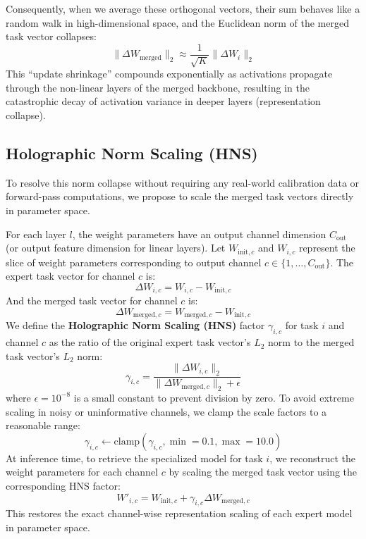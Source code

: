 \documentclass{article}
\theoremstyle{plain}
\theoremstyle{definition}
\theoremstyle{remark}
\begin{document}
Consequently, when we average these orthogonal vectors, their sum behaves like a random walk in high-dimensional space, and the Euclidean norm of the merged task vector collapses:
\begin{equation}
  \|\Delta W_{\text{merged}}\|_2 \approx \frac{1}{\sqrt{K}} \|\Delta W_i\|_2
\end{equation}
This ``update shrinkage'' compounds exponentially as activations propagate through the non-linear layers of the merged backbone, resulting in the catastrophic decay of activation variance in deeper layers (representation collapse).

\subsection{Holographic Norm Scaling (HNS)}
To resolve this norm collapse without requiring any real-world calibration data or forward-pass computations, we propose to scale the merged task vectors directly in parameter space.

For each layer $l$, the weight parameters have an output channel dimension $C_{\text{out}}$ (or output feature dimension for linear layers). Let $W_{\text{init}, c}$ and $W_{i, c}$ represent the slice of weight parameters corresponding to output channel $c \in \{1, \dots, C_{\text{out}}\}$. The expert task vector for channel $c$ is:
\begin{equation}
  \Delta W_{i, c} = W_{i, c} - W_{\text{init}, c}
\end{equation}
And the merged task vector for channel $c$ is:
\begin{equation}
  \Delta W_{\text{merged}, c} = W_{\text{merged}, c} - W_{\text{init}, c}
\end{equation}
We define the \textbf{Holographic Norm Scaling (HNS)} factor $\gamma_{i, c}$ for task $i$ and channel $c$ as the ratio of the original expert task vector's $L_2$ norm to the merged task vector's $L_2$ norm:
\begin{equation}
  \gamma_{i, c} = \frac{\|\Delta W_{i, c}\|_2}{\|\Delta W_{\text{merged}, c}\|_2 + \epsilon}
\end{equation}
where $\epsilon = 10^{-8}$ is a small constant to prevent division by zero. To avoid extreme scaling in noisy or uninformative channels, we clamp the scale factors to a reasonable range:
\begin{equation}
  \gamma_{i, c} \leftarrow \text{clamp}(\gamma_{i, c}, \min=0.1, \max=10.0)
\end{equation}
At inference time, to retrieve the specialized model for task $i$, we reconstruct the weight parameters for each channel $c$ by scaling the merged task vector using the corresponding HNS factor:
\begin{equation}
  W'_{i, c} = W_{\text{init}, c} + \gamma_{i, c} \Delta W_{\text{merged}, c}
\end{equation}
This restores the exact channel-wise representation scaling of each expert model in parameter space.
\end{document}
